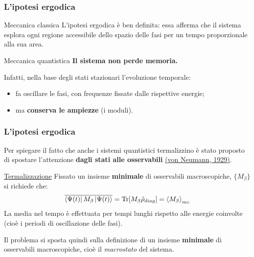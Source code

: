 \documentclass{beamer}
\theoremstyle{definition}
\theoremstyle{plain}
\begin{document}
\begin{frame}
	\frametitle{L'ipotesi ergodica}
	
	\begin{block}{Meccanica classica}
		L'ipotesi ergodica è ben definita: essa afferma che il sistema esplora ogni regione accessibile dello spazio delle fasi per un tempo proporzionale alla sua area.
	\end{block}
	\pause
	\begin{alertblock}{Meccanica quantistica}
		 \textbf{Il sistema non perde memoria.}
		 
		 Infatti, nella base degli stati stazionari l'evoluzione temporale:
		 \begin{itemize}[<+->]
		 	\item fa oscillare le fasi, con frequenze fissate dalle rispettive energie;
		 	\item ma \textbf{conserva le ampiezze} (i moduli).
		 \end{itemize}
	\end{alertblock}

\end{frame}

\begin{frame}
	\frametitle{L'ipotesi ergodica}
	
	Per spiegare il fatto che anche i sistemi quantistici termalizzino è stato proposto di spostare l'attenzione \textbf{dagli stati alle osservabili} \hyperlink{bib}{(von Neumann, 1929)}.
	
	\pause
	\begin{block}{\hyperlink{termdef2}{Termalizzazione}}
		Fissato un insieme \textbf{minimale} di osservabili macroscopiche, $\{ M_\beta \}$ si richiede che:
		\begin{equation*}
			\overline{\bra{\Psi(t)} M_\beta \ket{\Psi(t)}} = \Tr[M_\beta \hat{\rho}_{diag}] = \expval{M_\beta}_{mc}
		\end{equation*}
		{\footnotesize La media nel tempo è effettuata per tempi lunghi rispetto alle energie coinvolte (cioè i periodi di oscillazione delle fasi).}
	\end{block}
	
	\pause
	Il problema si sposta quindi sulla definizione di un insieme \textbf{minimale} di osservabili macroscopiche, cioè il \textit{macrostato} del sistema.
\end{frame}
\end{document}
